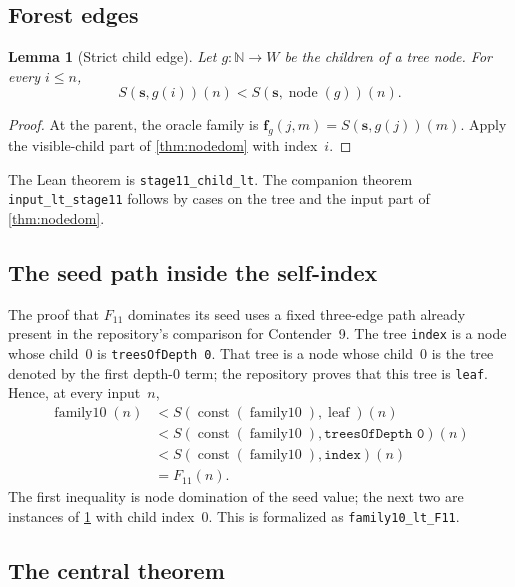 \documentclass[11pt]{article}
\newtheorem{lemma}[theorem]{Lemma}
\theoremstyle{definition}
\theoremstyle{remark}
\newcommand{\N}{\mathbb{N}}
\newcommand{\code}[1]{\texttt{#1}}
\begin{document}
\subsection{Forest edges}

\begin{lemma}[Strict child edge]
\label{lem:forestedge}
Let $g:\N\to W$ be the children of a tree node. For every $i\le n$,
\[
  S(\mathbf s,g(i))(n)
  < S(\mathbf s,\operatorname{node}(g))(n).
\]
\end{lemma}

\begin{proof}
At the parent, the oracle family is
$\mathbf f_g(j,m)=S(\mathbf s,g(j))(m)$. Apply the visible-child part of
\cref{thm:nodedom} with index~$i$.
\end{proof}

The Lean theorem is \code{stage11\_child\_lt}. The companion theorem
\code{input\_lt\_stage11} follows by cases on the tree and the input part of
\cref{thm:nodedom}.

\subsection{The seed path inside the self-index}

The proof that $F_{11}$ dominates its seed uses a fixed three-edge path already
present in the repository's comparison for Contender~9. The tree
\code{index} is a node whose child~0 is \code{treesOfDepth 0}. That tree is a
node whose child~0 is the tree denoted by the first depth-0 term; the repository
proves that this tree is \code{leaf}. Hence, at every input~$n$,
\begin{align*}
\operatorname{family10}(n)
&<S(\operatorname{const}(\operatorname{family10}),\operatorname{leaf})(n)\\
&<S(\operatorname{const}(\operatorname{family10}),\code{treesOfDepth 0})(n)\\
&<S(\operatorname{const}(\operatorname{family10}),\code{index})(n)\\
&=F_{11}(n).
\end{align*}
The first inequality is node domination of the seed value; the next two are
instances of \cref{lem:forestedge} with child index~0. This is formalized as
\code{family10\_lt\_F11}.

\subsection{The central theorem}
\end{document}

